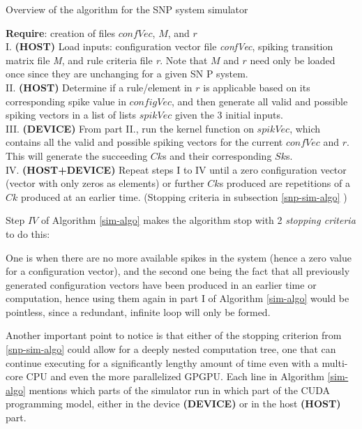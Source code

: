 \documentclass{acm_proc_article-sp}
\begin{document}
\begin{algorithm}
\caption{Overview of the algorithm for the SNP system
simulator}
\label{sim-algo}
\begin{algorithmic}
\textbf{Require}: creation of files $confVec$, $M$, and $r$\\

I. \textbf{(HOST)} Load inputs: configuration vector
file \textit{confVec}, spiking transition matrix
file \textit{M}, and rule criteria file \textit{r}.
Note that $M$ and $r$ need only be loaded 
once since they are unchanging for a given SN P system.\\


II. \textbf{(HOST)} Determine if a rule/element in $r$ 
is applicable based on its corresponding spike value 
in $configVec$, and then generate all valid and
possible spiking vectors in a list of lists $spikVec$ given the 3 initial inputs.\\


III. \textbf{(DEVICE)} From part II., run the kernel 
function on $spikVec$, which contains all 
the valid and possible spiking vectors for 
the current $confVec$ and $r$. This will 
generate the succeeding $Ck$s and their corresponding $Sk$s.\\


IV. \textbf{(HOST+DEVICE)} Repeat steps I to IV until
a zero configuration vector (vector with 
only zeros as elements) or further $Ck$s
produced are repetitions of a $Ck$
produced at an earlier time. (Stopping criteria in subsection \ref{snp-sim-algo} )
\end{algorithmic}
\end{algorithm}

	
Step $IV$ of Algorithm \ref{sim-algo} makes
the algorithm stop with 2 \textit{stopping criteria} to do this:

One is when there are no more available spikes in the system (hence a
zero value for a configuration vector), and the second one
being the fact that all previously generated configuration
vectors have been produced in an earlier time or
computation, hence using them again in part I of Algorithm \ref{sim-algo} would be pointless, since a
redundant, infinite loop will only be formed.

Another
important point to notice is that either of the stopping
criterion from \ref{snp-sim-algo} could allow for a deeply nested computation tree,
one that can continue executing for a significantly lengthy amount of
time even with a multi-core CPU and even the more parallelized
GPGPU.
Each line in Algorithm \ref{sim-algo} mentions
which parts of the simulator run in which part of the CUDA
programming model, either in the device \textbf{(DEVICE)} or in the host \textbf{(HOST)} part.
\end{document}
